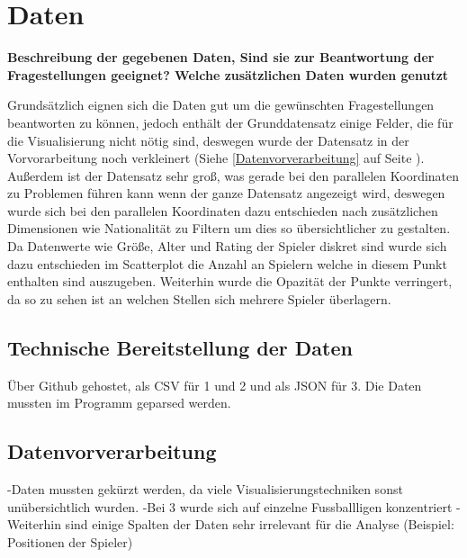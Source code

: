 \documentclass[usegeometry=true]{scrartcl}
\begin{document}
\section{Daten}

\textbf{Beschreibung der gegebenen Daten, Sind sie zur Beantwortung der Fragestellungen geeignet? Welche zusätzlichen Daten wurden genutzt} 

Grundsätzlich eignen sich die Daten gut um die gewünschten Fragestellungen beantworten zu können, jedoch enthält der Grunddatensatz einige Felder, die für die Visualisierung nicht nötig sind, deswegen wurde der Datensatz in der Vorvorarbeitung noch verkleinert (Siehe \ref{Datenvorverarbeitung} auf Seite \pageref{Datenvorverarbeitung}). Außerdem ist der Datensatz sehr groß, was gerade bei den parallelen Koordinaten zu Problemen führen kann wenn der ganze Datensatz angezeigt wird, deswegen wurde sich bei den parallelen Koordinaten dazu entschieden nach zusätzlichen Dimensionen wie Nationalität zu Filtern um dies so übersichtlicher zu gestalten. Da Datenwerte wie Größe, Alter und Rating der Spieler diskret sind wurde sich dazu entschieden im Scatterplot die Anzahl an Spielern welche in diesem Punkt enthalten sind auszugeben. Weiterhin wurde die Opazität der Punkte verringert, da so zu sehen ist an welchen Stellen sich mehrere Spieler überlagern. 
\subsection{Technische Bereitstellung der Daten}

Über Github gehostet, als CSV für 1 und 2 und als JSON für 3.
Die Daten mussten im Programm geparsed werden.
\subsection{\label{Datenvorverarbeitung}Datenvorverarbeitung}
-Daten mussten gekürzt werden, da viele Visualisierungstechniken sonst unübersichtlich wurden.
-Bei 3 wurde sich auf einzelne Fussballligen konzentriert
-Weiterhin sind einige Spalten der Daten sehr irrelevant für die Analyse (Beispiel: Positionen der Spieler) 
\end{document}
